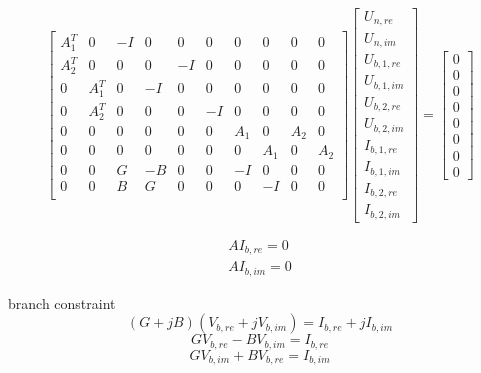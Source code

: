 \documentclass{book}
\begin{document}
\begin{equation}
\begin{bmatrix}
A_1^T&0&-I&0&0&0&0&0&0&0\\
A_2^T&0&0&0&-I&0&0&0&0&0\\
0&A_1^T&0&-I&0&0&0&0&0&0\\
0&A_2^T&0&0&0&-I&0&0&0&0\\
0&0&0&0&0&0&A_1&0&A_2&0\\
0&0&0&0&0&0&0&A_1&0&A_2\\
0&0&G&-B&0&0&-I&0&0&0\\
0&0&B&G&0&0&0&-I&0&0\\
\end{bmatrix}
\begin{bmatrix}
U_{n,re}\\
U_{n,im}\\
U_{b,1,re}\\
U_{b,1,im}\\
U_{b,2,re}\\
U_{b,2,im}\\
I_{b,1,re}\\
I_{b,1,im}\\
I_{b,2,re}\\
I_{b,2,im}
\end{bmatrix}
=\begin{bmatrix}
0\\
0\\
0\\
0\\
0\\
0\\
0\\
0
\end{bmatrix}
\end{equation}












\begin{equation}
\begin{aligned}
AI_{b,re}=0\\
AI_{b,im}=0
\end{aligned}
\end{equation}


branch constraint
\begin{equation}
(G+jB)(V_{b,re}+jV_{b,im})=I_{b,re}+jI_{b,im}
\end{equation}
\begin{equation}
GV_{b,re}-BV_{b,im}=I_{b,re}
\end{equation}
\begin{equation}
GV_{b,im}+BV_{b,re}=I_{b,im}
\end{equation}
\end{document}
